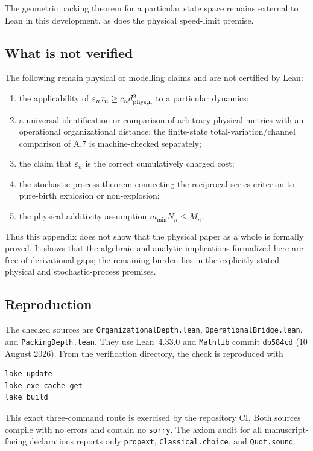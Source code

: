 The geometric packing theorem for a particular state space remains external to
Lean in this development, as does the physical speed-limit premise.

\subsection{What is not verified}

The following remain physical or modelling claims and are not certified by Lean:

\begin{enumerate}
\item the applicability of $\varepsilon_n\tau_n\ge c_nd_{\rm phys,n}^2$ to a
particular dynamics;
\item a universal identification or comparison of arbitrary physical metrics
with an operational organizational distance; the finite-state
total-variation/channel comparison of A.7 is machine-checked separately;
\item the claim that $\varepsilon_n$ is the correct cumulatively charged cost;
\item the stochastic-process theorem connecting the reciprocal-series criterion
to pure-birth explosion or non-explosion;
\item the physical additivity assumption $m_{\min}N_n\le M_n$.
\end{enumerate}

Thus this appendix does not show that the physical paper as a whole is formally
proved. It shows that the algebraic and analytic implications formalized here
are free of derivational gaps; the remaining burden lies in the explicitly
stated physical and stochastic-process premises.

\subsection{Reproduction}

The checked sources are
\nolinkurl{OrganizationalDepth.lean},
\nolinkurl{OperationalBridge.lean}, and
\nolinkurl{PackingDepth.lean}. They use Lean~4.33.0 and
\texttt{Mathlib} commit \texttt{db584cd} (10 August 2026). From the
verification directory, the check is reproduced with
\begin{verbatim}
lake update
lake exe cache get
lake build
\end{verbatim}
This exact three-command route is exercised by the repository CI. Both sources
compile with no errors and contain no \texttt{sorry}. The axiom audit for all
manuscript-facing declarations reports only
\texttt{propext}, \texttt{Classical.choice}, and \texttt{Quot.sound}.

